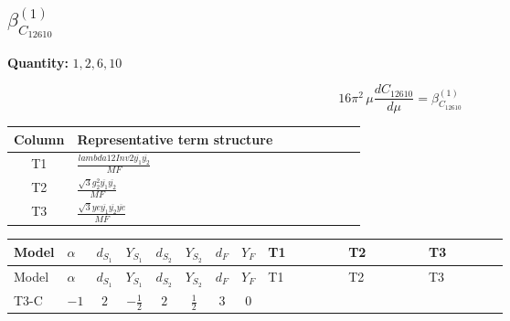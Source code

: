 \documentclass[8pt]{article}
\begin{document}
\begin{landscape}
\section*{$\beta_{C_{12610}}^{(1)}$}
\noindent\textbf{Quantity: }$\mathrm{1,2,6,10}$\par\smallskip
\[16\pi^2\,\mu\frac{d C_{12610}}{d\mu}=\beta_{C_{12610}}^{(1)}\]
\begin{center}
\begin{tabular}{@{}c >{\raggedright\arraybackslash}p{0.82\linewidth}@{}}
\toprule
Column & Representative term structure \\
\midrule
T1 & \(\displaystyle \frac{lambda12Inv2 \overline{y_{1}} \overline{y_{2}}}{MF}\) \\
\midrule
T2 & \(\displaystyle \frac{\sqrt{3} g_{2}^{2} \overline{y_{1}} \overline{y_{2}}}{MF}\) \\
\midrule
T3 & \(\displaystyle \frac{\sqrt{3} ye \overline{y_{1}} \overline{y_{2}} \overline{ye}}{MF}\) \\
\midrule
\bottomrule
\end{tabular}
\end{center}
\smallskip
\tiny
\begin{longtable}{@{}llcccccc >{\raggedright\arraybackslash}p{0.21\linewidth} >{\raggedright\arraybackslash}p{0.21\linewidth} >{\raggedright\arraybackslash}p{0.21\linewidth}@{}}
\toprule
Model & $\alpha$ & $d_{S_1}$ & $Y_{S_1}$ & $d_{S_2}$ & $Y_{S_2}$ & $d_F$ & $Y_F$ & T1 & T2 & T3 \\
\midrule
\endfirsthead
\toprule
Model & $\alpha$ & $d_{S_1}$ & $Y_{S_1}$ & $d_{S_2}$ & $Y_{S_2}$ & $d_F$ & $Y_F$ & T1 & T2 & T3 \\
\midrule
\endhead
T3-C & $-1$ & $2$ & $-\frac{1}{2}$ & $2$ & $\frac{1}{2}$ & $3$ & $0$ & \scriptsize\adjustbox{max width=\linewidth}{$\begin{gathered} - \frac{lambda12Inv2 \overline{y_{1}} \overline{y_{2}}}{6 MF}\end{gathered}$} & \scriptsize\adjustbox{max width=\linewidth}{$\begin{gathered} - \frac{\sqrt{3} g_{2}^{2} \overline{y_{1}} \overline{y_{2}}}{8 MF}\end{gathered}$} & \scriptsize\adjustbox{max width=\linewidth}{$\begin{gathered} \frac{\sqrt{3} ye \overline{y_{1}} \overline{y_{2}} \overline{ye}}{24 MF}\end{gathered}$} \\
\midrule
\bottomrule
\end{longtable}
\clearpage

\end{landscape}
\end{document}
